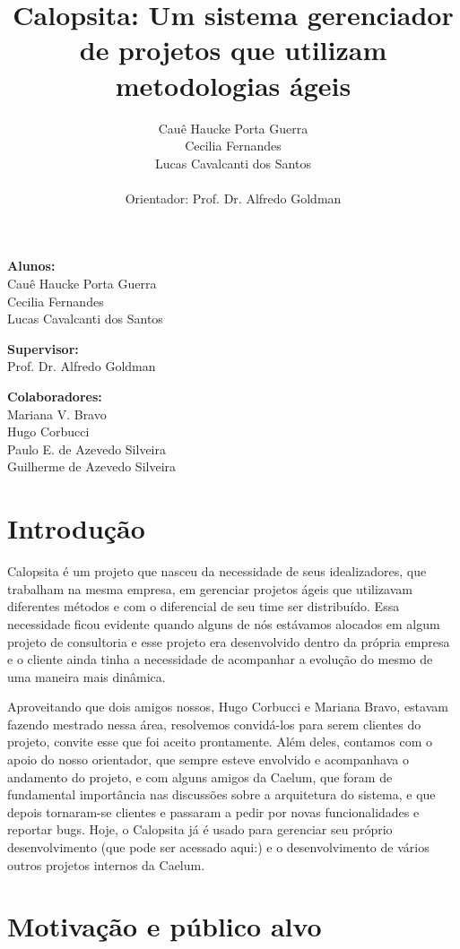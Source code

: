 \documentclass[titlepage,a4paper]{article}
\title{Calopsita: Um sistema gerenciador de projetos que utilizam metodologias ágeis}
\author{Cauê Haucke Porta Guerra\\Cecilia Fernandes\\Lucas Cavalcanti dos Santos\\ \\Orientador: Prof. Dr. Alfredo Goldman}
\begin{document}
\maketitle

\begin{description} 
\item{\textbf{Alunos:}\\Cauê Haucke Porta Guerra\\Cecilia Fernandes\\Lucas Cavalcanti dos Santos}
\item{\textbf{Supervisor:}\\Prof. Dr. Alfredo Goldman}
\item{\textbf{Colaboradores:}\\Mariana V. Bravo\\Hugo Corbucci\\Paulo E. de Azevedo Silveira\\Guilherme de Azevedo Silveira}
\end{description}

\section{Introdução}
Calopsita é um projeto que nasceu da necessidade de seus idealizadores, que trabalham na mesma empresa, em gerenciar projetos ágeis que utilizavam diferentes métodos e com o diferencial de seu time ser distribuído. Essa necessidade ficou evidente quando alguns de nós estávamos alocados em algum projeto de consultoria e esse projeto era desenvolvido dentro da própria empresa e o cliente ainda tinha a necessidade de acompanhar a evolução do mesmo de uma maneira mais dinâmica.

Aproveitando que dois amigos nossos, Hugo Corbucci e Mariana Bravo, estavam fazendo mestrado nessa área, resolvemos convidá-los para serem clientes do projeto, convite esse que foi aceito prontamente. Além deles, contamos com o apoio do nosso orientador, que sempre esteve envolvido e acompanhava o andamento do projeto, e com alguns amigos da Caelum, que foram de fundamental importância nas discussões sobre a arquitetura do sistema, e que depois tornaram-se clientes e passaram a pedir por novas funcionalidades e reportar bugs. Hoje, o Calopsita já é usado para gerenciar seu próprio desenvolvimento (que pode ser acessado aqui:) e o desenvolvimento de vários outros projetos internos da Caelum.

\section{Motivação e público alvo}
\end{document}
